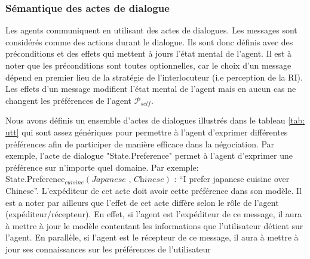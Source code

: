 \documentclass [french]{sig-alternate-05-2015}
\begin{document}
\subsubsection{Sémantique des actes de dialogue}
\par Les agents communiquent en utilisant des actes de dialogues. Les messages sont considérés comme des actions durant le dialogue. Ils sont donc définis avec des préconditions et des effets qui mettent à jours l'état mental de l'agent. Il est à noter que les préconditions sont toutes optionnelles, car le choix d'un message dépend en premier lieu de la stratégie de l'interlocuteur (i.e perception de la RI). Les effets d'un message modifient l'état mental de l'agent  mais en aucun cas ne changent les préférences de l'agent $\mathcal{P}_{self}$. 
\par Nous avons définis un ensemble d'actes de dialogues illustrés dans le tableau \ref{tab: utt} qui sont assez génériques pour permettre à l'agent d'exprimer différentes préférences afin de participer de manière efficace dans la négociation. Par exemple, l'acte de dialogue "State.Preference" permet à l'agent d'exprimer une préférence sur n'importe quel domaine. Par exemple: \\ State.Preference$_{cuisine}(\textit{Japanese , Chinese})$ : ``I prefer japanese cuisine over Chinese''. 
L'expéditeur de cet acte doit avoir cette préférence dans son modèle. Il est a noter par ailleurs que l'effet de cet acte diffère selon le rôle de l'agent (expéditeur/récepteur). En effet, si l'agent est l'expéditeur de ce message, il aura à mettre à jour le modèle contentant les informations que l'utilisateur détient sur l'agent. En parallèle, si l'agent est le récepteur de ce message, il aura à mettre à jour ses connaissances sur les préférences de l'utilisateur
\end{document}
